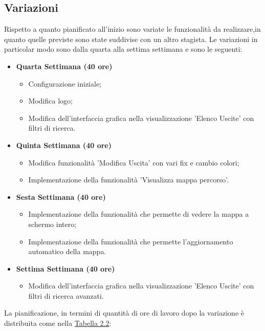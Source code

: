 \subsection{Variazioni}
Rispetto a quanto pianificato all'inizio sono variate le funzionalità da realizzare,in quanto quelle previste sono state suddivise con un altro stagista.
Le variazioni in particolar modo sono dalla quarta alla settima settimana e sono le seguenti:
\begin{itemize}
\item \textbf{Quarta Settimana (40 ore)} 
\begin{itemize}
	\item Configurazione iniziale;
	\item Modifica logo;
	\item Modifica dell'interfaccia grafica nella visualizzazione 'Elenco Uscite' con filtri di ricerca.
\end{itemize}
\item \textbf{Quinta Settimana (40 ore)} 
\begin{itemize}
	\item Modifica funzionalità 'Modifica Uscita' con vari fix e cambio colori;
	\item Implementazione della funzionalità 'Visualizza mappa percorso'.
\end{itemize}
\item \textbf{Sesta Settimana (40 ore)} 
\begin{itemize}
	\item Implementazione della funzionalità che permette di vedere la mappa a schermo intero;
	\item Implementazione della funzionalità che permette l'aggiornamento automatico della mappa.
\end{itemize}
\item \textbf{Settima Settimana (40 ore)} 
\begin{itemize}
	\item Modifica dell'interfaccia grafica nella visualizzazione 'Elenco Uscite' con filtri di ricerca avanzati.
\end{itemize}
\end{itemize}
La pianificazione, in termini di quantità di ore di lavoro dopo la variazione è distribuita come nella \hyperref[tab:Tabella riassuntiva della pianificazione di stage con variazioni]{Tabella 2.2}:
